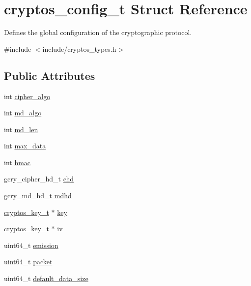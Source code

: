 \hypertarget{structcryptos__config__t}{
\section{cryptos\_\-config\_\-t Struct Reference}
\label{structcryptos__config__t}
}


Defines the global configuration of the cryptographic protocol.  


{\ttfamily \#include $<$include/cryptos\_\-types.h$>$}\subsection*{Public Attributes}
\begin{DoxyCompactItemize}
\item 
int \hyperlink{structcryptos__config__t_a235962cb863bfd75cb837814bd86cef4}{cipher\_\-algo}
\item 
int \hyperlink{structcryptos__config__t_ad9bab3292aaefb4655a76ba03bb4e647}{md\_\-algo}
\item 
int \hyperlink{structcryptos__config__t_accebe1ccacfcc0e531c012ad4dfa9ff7}{md\_\-len}
\item 
int \hyperlink{structcryptos__config__t_a131f67ed366d0d24a6f9dd20e06f2030}{max\_\-data}
\item 
int \hyperlink{structcryptos__config__t_a4ccc3efa7eb7c5bac4424489b1e9e616}{hmac}
\item 
gcry\_\-cipher\_\-hd\_\-t \hyperlink{structcryptos__config__t_a07ceae1485d08d3ef32dd276c1822860}{chd}
\item 
gcry\_\-md\_\-hd\_\-t \hyperlink{structcryptos__config__t_ade08a42531e6824fd61ef4698d0c851c}{mdhd}
\item 
\hyperlink{structcryptos__key__t}{cryptos\_\-key\_\-t} $\ast$ \hyperlink{structcryptos__config__t_a3a247a5836789dbf4b0a0000754794a9}{key}
\item 
\hyperlink{structcryptos__key__t}{cryptos\_\-key\_\-t} $\ast$ \hyperlink{structcryptos__config__t_a66a52c965c6c838e343ebeb05a4a5cf2}{iv}
\item 
uint64\_\-t \hyperlink{structcryptos__config__t_a201dba03c6609d57a8c2949496e52cdf}{emission}
\item 
uint64\_\-t \hyperlink{structcryptos__config__t_ad027dbc31d02c462e5c701e9f407c092}{packet}
\item 
uint64\_\-t \hyperlink{structcryptos__config__t_adb53007d66d9e4258ba5765958df794b}{default\_\-data\_\-size}
\end{DoxyCompactItemize}


